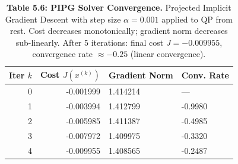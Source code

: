\begin{table}[H]
\centering
\caption{\textbf{Table 5.6: PIPG Solver Convergence.} Projected Implicit Gradient Descent with step size $\alpha = 0.001$ applied to QP from rest. Cost decreases monotonically; gradient norm decreases sub-linearly. After 5 iterations: final cost $J = -0.009955$, convergence rate $\approx -0.25$ (linear convergence).}
\label{tab:5-6}
\small
\begin{tabular}{rrll}
\toprule
\textbf{Iter $k$} & \textbf{Cost $J(x^{(k)})$} & \textbf{Gradient Norm} & \textbf{Conv. Rate} \\
\midrule
\rowcolor{gray!15}
0 & -0.001999 & 1.414214 & — \\
1 & -0.003994 & 1.412799 & -0.9980 \\
\rowcolor{gray!15}
2 & -0.005985 & 1.411387 & -0.4985 \\
3 & -0.007972 & 1.409975 & -0.3320 \\
\rowcolor{gray!15}
4 & -0.009955 & 1.408565 & -0.2487 \\
\bottomrule
\end{tabular}
\end{table}
